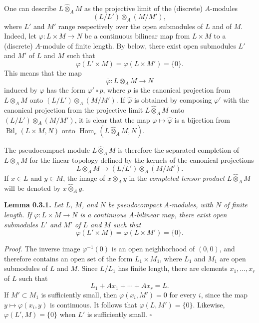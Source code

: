 One can describe \(L\widehat{\otimes}_{A}M\) as the projective limit of
the (discrete) \(A\)-modules
\[
  (L/L')\otimes_{A}(M/M'),
\]
where \(L'\) and \(M'\) range respectively over the open submodules of
\(L\) and of \(M\). Indeed, let
\(\varphi:L\times M\to N\) be a continuous bilinear map from
\(L\times M\) to a (discrete) \(A\)-module of finite length. By  below, there exist
open submodules \(L'\) and \(M'\) of \(L\) and \(M\) such that
\[
  \varphi(L'\times M)=\varphi(L\times M')=\{0\}.
\]
This means that the map
\[
  \overline{\varphi}:L\otimes_{A}M\longrightarrow N
\]
induced by \(\varphi\) has the form \(\varphi'\circ p\), where \(p\) is
the canonical projection from \(L\otimes_{A}M\) onto
\((L/L')\otimes_{A}(M/M')\). If \(\widehat{\varphi}\) is obtained by
composing \(\varphi'\) with the canonical projection from the projective
limit \(L\widehat{\otimes}_{A}M\) onto \((L/L')\otimes_{A}(M/M')\), it is
clear that the map \(\varphi\mapsto\widehat{\varphi}\) is a bijection
from \(\operatorname{Bil}_{c}(L\times M,N)\) onto
\(\operatorname{Hom}_{c}(L\widehat{\otimes}_{A}M,N)\).

The pseudocompact module \(L\widehat{\otimes}_{A}M\) is therefore the
separated completion of \(L\otimes_{A}M\) for the linear topology
defined by the kernels of the canonical projections
\[
  L\otimes_{A}M
  \longrightarrow
  (L/L')\otimes_{A}(M/M').
\]
If \(x\in L\) and \(y\in M\), the image of \(x\otimes_{A}y\) in the
\emph{completed tensor product} \(L\widehat{\otimes}_{A}M\) will be
denoted by \(x\widehat{\otimes}_{A}y\).

\medskip
\noindent\textbf{Lemma 0.3.1.}
\label{sga3:VIIB:0.3.1}
\textit{Let \(L\), \(M\), and \(N\) be pseudocompact \(A\)-modules,
with \(N\) of finite length. If
\(\varphi:L\times M\to N\) is a continuous \(A\)-bilinear map, there
exist open submodules \(L'\) and \(M'\) of \(L\) and \(M\) such that}
\[
  \varphi(L'\times M)=\varphi(L\times M')=\{0\}.
\]

\noindent\textit{Proof.}
The inverse image \(\varphi^{-1}(0)\) is an open neighborhood of
\((0,0)\), and therefore contains an open set of the form
\(L_{1}\times M_{1}\), where \(L_{1}\) and \(M_{1}\) are open
submodules of \(L\) and \(M\). Since \(L/L_{1}\) has finite length,
there are elements \(x_{1},\ldots,x_{r}\) of \(L\) such that
\[
  L_{1}+Ax_{1}+\cdots+Ax_{r}=L.
\]
If \(M'\subset M_{1}\) is sufficiently small, then
\(\varphi(x_i,M')=0\) for every \(i\), since the map
\(y\mapsto\varphi(x_i,y)\) is continuous. It follows that
\(\varphi(L,M')=\{0\}\). Likewise,
\(\varphi(L',M)=\{0\}\) when \(L'\) is sufficiently small.
\hfill\(\square\)


